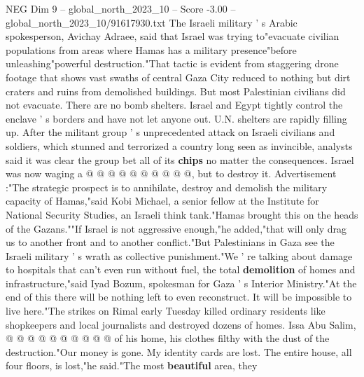\begin{textsample}{NEG Dim 9 – global\_north\_2023\_10 – Score -3.00 – global\_north\_2023\_10/91617930.txt}
The Israeli military ' s Arabic spokesperson, Avichay Adraee, said that Israel was trying to"evacuate civilian populations from areas where Hamas has a military presence"before unleashing"powerful destruction."That tactic is evident from staggering drone footage that shows vast swaths of central Gaza City reduced to nothing but dirt craters and ruins from demolished buildings.
But most Palestinian civilians did not evacuate.
There are no bomb shelters.
Israel and Egypt tightly control the enclave ' s borders and have not let anyone out.
U.N. shelters are rapidly filling up.
After the militant group ' s unprecedented attack on Israeli civilians and soldiers, which stunned and terrorized a country long seen as invincible, analysts said it was clear the group bet all of its \textbf{chips} no matter the consequences.
Israel was now waging a @ @ @ @ @ @ @ @ @ @, but to destroy it.
Advertisement :"The strategic prospect is to annihilate, destroy and demolish the military capacity of Hamas,"said Kobi Michael, a senior fellow at the Institute for National Security Studies, an Israeli think tank."Hamas brought this on the heads of the Gazans.""If Israel is not aggressive enough,"he added,"that will only drag us to another front and to another conflict."But Palestinians in Gaza see the Israeli military ' s wrath as collective punishment."We ' re talking about damage to hospitals that can't even run without fuel, the total \textbf{demolition} of homes and infrastructure,"said Iyad Bozum, spokesman for Gaza ' s Interior Ministry."At the end of this there will be nothing left to even reconstruct.
It will be impossible to live here."The strikes on Rimal early Tuesday killed ordinary residents like shopkeepers and local journalists and destroyed dozens of homes.
Issa Abu Salim, @ @ @ @ @ @ @ @ @ @ of his home, his clothes filthy with the dust of the destruction."Our money is gone.
My identity cards are lost.
The entire house, all four floors, is lost,"he said."The most \textbf{beautiful} area, they

\end{textsample}

